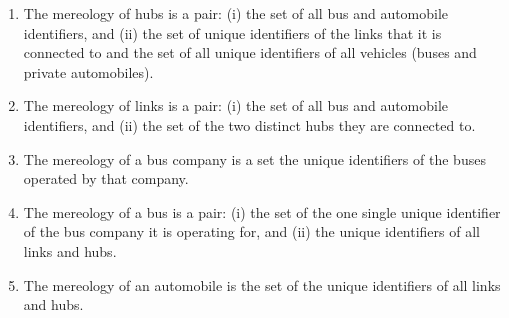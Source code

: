 \label{p-ch2.Mereology}\label{p-refMereology of Parts}\label{p-m1}
\rm\smallish\LLLL\rm
\begin{enumerate}\setei
\item \label{p-mereo-000} The mereology of hubs is a pair: (i) the set  
  of all bus and automobile identifiers\footnotemark, and (ii) the set of unique
  identifiers of the links that it is connected to and the set of all
  unique identifiers of all vehicles (buses and private
  automobiles).\footnotemark
\item \label{p-mereo-010} The mereology of links is a pair: (i) the 
  set of all bus and automobile identifiers, and  (ii)  the
  set of the two distinct hubs they are connected to. 
\item \label{p-mereo-020} The mereology of a bus company is a set the
  unique identifiers of the buses operated by 
  that company. 
\item \label{p-mereo-030} The mereology of a bus is  a pair: (i) 
  the set of the one single
  unique identifier of the bus company it is operating for, and (ii)
  the unique 
  identifiers of all links and hubs\footnotemark.  
\item \label{p-mereo-040} The mereology of an automobile is the set of
  the unique 
  identifiers of all links and hubs\footnotemark. 
  \savei\end{enumerate}
\mnewfoil
